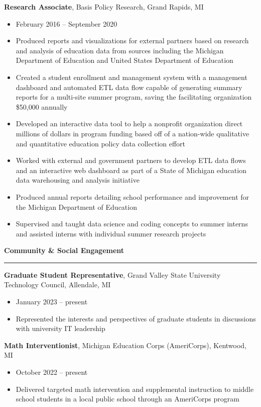 \documentclass[a4paper, 11pt]{article}
\begin{document}
      \textbf{Research Associate}, Basis Policy Research, Grand Rapids, MI
      \begin{itemize}
          \item February 2016 -- September 2020
          \item Produced reports and visualizations for external partners based on research and analysis of education data from sources including the Michigan Department of Education and United States Department of Education
          \item Created a student enrollment and management system with a management dashboard and automated ETL data flow capable of generating summary reports for a multi-site summer program, saving the facilitating organization \$50,000 annually
          \item Developed an interactive data tool to help a nonprofit organization direct millions of dollars in program funding based off of a nation-wide qualitative and quantitative education policy data collection effort
          \item Worked with external and government partners to develop ETL data flows and an interactive web dashboard as part of a State of Michigan education data warehousing and analysis initiative
          \item Produced annual reports detailing school performance and improvement for the Michigan Department of Education
          \item Supervised and taught data science and coding concepts to summer interns and assisted interns with individual summer research projects
      \end{itemize}

    \vspace{.5em}
    {\noindent\large\textbf{Community \& Social Engagement}\par}\vspace{.1em}
    \hrule
    \vspace{1em}

      \textbf{Graduate Student Representative}, Grand Valley State University Technology Council, Allendale, MI
      \begin{itemize}
        \item January 2023 -- present
        \item Represented the interests and perspectives of graduate students in discussions with university IT leadership
      \end{itemize}

      \textbf{Math Interventionist}, Michigan Education Corps (AmeriCorps), Kentwood, MI
      \begin{itemize}
        \item October 2022 -- present
        \item Delivered targeted math intervention and supplemental instruction to middle school students in a local public school through an AmeriCorps program
      \end{itemize}
\end{document}
